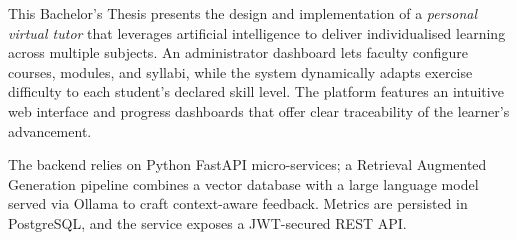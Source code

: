 {\setlength{\parskip}{8mm}

\large{
This Bachelor’s Thesis presents the design and implementation of a
\emph{personal virtual tutor} that leverages artificial intelligence to deliver
individualised learning across multiple subjects.  
An administrator dashboard lets faculty configure courses, modules, and
syllabi, while the system dynamically adapts exercise difficulty to each
student’s declared skill level.  
The platform features an intuitive web interface and progress dashboards that
offer clear traceability of the learner’s advancement.

The backend relies on Python FastAPI micro-services; a
Retrieval Augmented Generation pipeline combines a vector database with a large
language model served via Ollama to craft context-aware feedback. Metrics are
persisted in PostgreSQL, and the service exposes a JWT-secured REST API.
}

}
